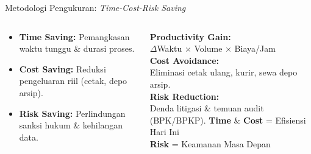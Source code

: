 \documentclass[aspectratio=169,11pt]{beamer}
\begin{document}
\begin{frame}{Metodologi Pengukuran: \textit{Time-Cost-Risk Saving}}
    \vspace{0.2cm}
    \begin{columns}[T]
        \begin{premiumbox}
            \scriptsize
            \begin{itemize}
                \item \textcolor{plnblue}{\textbf{Time Saving:}} Pemangkasan waktu tunggu \& durasi proses.
                \item \textcolor{plnorange}{\textbf{Cost Saving:}} Reduksi pengeluaran riil (cetak, depo arsip).
                \item \textcolor{plngreen}{\textbf{Risk Saving:}} Perlindungan sanksi hukum \& kehilangan data.
            \end{itemize}
        \end{premiumbox}
        
        \begin{orangebox}
            \tiny
            \textbf{Productivity Gain:}\\
            $\Delta$Waktu $\times$ Volume $\times$ Biaya/Jam\\[0.1cm]
            \textbf{Cost Avoidance:}\\
            Eliminasi cetak ulang, kurir, sewa depo arsip.\\[0.1cm]
            \textbf{Risk Reduction:}\\
            Denda litigasi \& temuan audit (BPK/BPKP).
            \vfill
            \textbf{Time} \& \textbf{Cost} = Efisiensi Hari Ini\\
            \textbf{Risk} = Keamanan Masa Depan
        \end{orangebox}
    \end{columns}
\end{frame}
\end{document}
